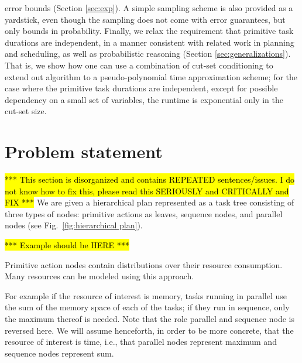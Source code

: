 \documentclass[review]{elsarticle}
\begin{document}
error bounds (Section \ref{sec:exp}). A simple sampling scheme is also provided as a yardstick, even though the sampling does not come with error guarantees, but only bounds in probability. 
Finally, we relax the requirement that primitive task durations are independent, in a manner consistent with related work in planning and scheduling, as well as probabilistic 
reasoning (Section \ref{sec:generalizations}). That is, we show how one
can use a combination of cut-set conditioning to extend out algorithm to
a pseudo-polynomial time approximation scheme; for the case where the primitive task durations are independent, except for possible dependency on a small set of variables, the runtime is exponential only in the cut-set size.

\section{Problem statement}\label{sec:formal}

\hl{*** This section is disorganized and contains REPEATED
sentences/issues. I do not know how to fix this, please read this
SERIOUSLY and CRITICALLY and FIX ***}
We are given a hierarchical plan represented as a task tree consisting of three types of nodes: primitive actions as leaves, sequence nodes, and parallel nodes (see Fig.~\ref{fig:hierarchical plan}).

\hl{*** Example should be HERE ***}

Primitive action nodes contain distributions over their resource consumption. Many resources can be modeled using this approach. 
 
For example if the resource of interest is memory, tasks running in parallel use the sum of the memory space of each of the tasks; if they run in sequence, only the maximum thereof is needed. Note that the role parallel and sequence node is reversed here. We will assume henceforth, in order to be more concrete, that the resource of interest is time, i.e., that parallel nodes represent maximum and sequence nodes represent sum.
\end{document}
